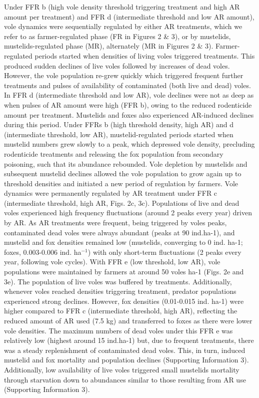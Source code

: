 \documentclass[11pt]{article}
\begin{document}
Under FFR b (high vole density threshold triggering treatment and high AR amount per treatment) and FFR d (intermediate threshold and low AR amount), vole dynamics were sequentially regulated by either AR treatments, which we refer to as farmer-regulated phase (FR in Figures 2 \& 3), or by mustelids, mustelids-regulated phase (MR), alternately (MR in Figures 2 \& 3). Farmer-regulated periods started when densities of living voles triggered treatments. This produced sudden declines of live voles followed by increases of dead voles. However, the vole population re-grew quickly which triggered frequent further treatments and pulses of availability of contaminated (both live and dead) voles. In FFR d (intermediate threshold and low AR), vole declines were not as deep as when pulses of AR amount were high (FFR b), owing to the reduced rodenticide amount per treatment. Mustelids and foxes also experienced AR-induced declines during this period. Under FFRs b (high threshold density, high AR) and d (intermediate threshold, low AR), mustelid-regulated periods started when mustelid numbers grew slowly to a peak, which depressed vole density, precluding rodenticide treatments and releasing the fox population from secondary poisoning, such that its abundance rebounded. Vole depletion by mustelids and subsequent mustelid declines allowed the vole population to grow again up to threshold densities and initiated a new period of regulation by farmers.
Vole dynamics were permanently regulated by AR treatment under FFR c (intermediate threshold, high AR, Figs. 2c, 3c). Populations of live and dead voles experienced high frequency fluctuations (around 2 peaks every year) driven by AR. As AR treatments were frequent, being triggered by voles peaks, contaminated dead voles were always abundant (peaks at 90 ind.ha-1), and mustelid and fox densities remained low (mustelids, converging to 0 ind. ha-1; foxes, 0.003-0.006 ind. ha$^{-1}$) with only short-term fluctuations (2 peaks every year, following vole cycles).
With FFR e (low threshold, low AR), vole populations were maintained by farmers at around 50 voles ha-1 (Figs. 2e and 3e). The population of live voles was buffered by treatments. Additionally, whenever voles reached densities triggering treatment, predator populations experienced strong declines. However, fox densities (0.01-0.015 ind. ha-1) were higher compared to FFR c (intermediate threshold, high AR), reflecting the reduced amount of AR used (7.5 kg) and transferred to foxes as there were lower vole densities. The maximum numbers of dead voles under this FFR e was relatively low (highest around 15 ind.ha-1) but, due to frequent treatments, there was a steady replenishment of contaminated dead voles. This, in turn, induced mustelid and fox mortality and population declines (Supporting Information 3). Additionally, low availability of live voles triggered small mustelids mortality through starvation down to abundances similar to those resulting from AR use (Supporting Information 3). 
\end{document}
